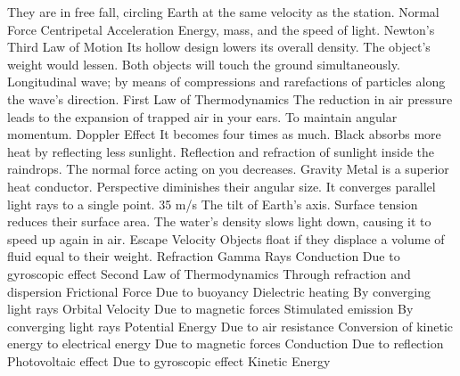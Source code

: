 \answerkey
{} They are in free fall, circling Earth at the same velocity as the station.
 Normal Force
 Centripetal Acceleration
 Energy, mass, and the speed of light.
 Newton's Third Law of Motion
 Its hollow design lowers its overall density.
 The object's weight would lessen.
 Both objects will touch the ground simultaneously.
 Longitudinal wave; by means of compressions and rarefactions of particles along the wave's direction.
 First Law of Thermodynamics
 The reduction in air pressure leads to the expansion of trapped air in your ears.
 To maintain angular momentum.
 Doppler Effect
 It becomes four times as much.
 Black absorbs more heat by reflecting less sunlight.
 Reflection and refraction of sunlight inside the raindrops.
 The normal force acting on you decreases.
 Gravity
 Metal is a superior heat conductor.
 Perspective diminishes their angular size.
 It converges parallel light rays to a single point.
 35 m/s
 The tilt of Earth's axis.
 Surface tension reduces their surface area.
 The water's density slows light down, causing it to speed up again in air.
 Escape Velocity
 Objects float if they displace a volume of fluid equal to their weight.
 Refraction
 Gamma Rays
 Conduction
 Due to gyroscopic effect
 Second Law of Thermodynamics
 Through refraction and dispersion
 Frictional Force
 Due to buoyancy
 Dielectric heating
 By converging light rays
 Orbital Velocity
 Due to magnetic forces
 Stimulated emission
 By converging light rays
 Potential Energy
 Due to air resistance
 Conversion of kinetic energy to electrical energy
 Due to magnetic forces
 Conduction
 Due to reflection
 Photovoltaic effect
 Due to gyroscopic effect
 Kinetic Energy
\endanswerkey